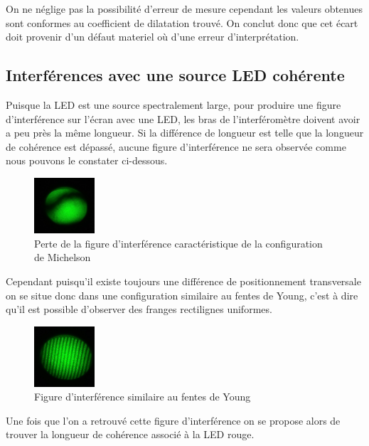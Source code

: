 \documentclass[11pt, openright]{book}
\begin{document}
					On ne néglige pas la possibilité d'erreur de mesure cependant les valeurs obtenues sont conformes au coefficient de dilatation trouvé. On conclut donc que cet écart doit provenir d'un défaut materiel où d'une erreur d'interprétation.

				\subsection{Interférences avec une source LED cohérente}

					Puisque la LED est une source spectralement large, pour produire une figure d'interférence sur l'écran avec une LED, les bras de l'interféromètre doivent avoir a peu près la même longueur. Si la différence de longueur est telle que la longueur de cohérence est dépassé, aucune figure d'interférence ne sera observée comme nous pouvons le constater ci-dessous.

					\begin{figure}[ht!]
						\centering
						\includegraphics[width=0.2\textwidth]{./object/g5.jpg}
						\caption{Perte de la figure d'interférence caractéristique de la configuration de Michelson}
					\end{figure}

					Cependant puisqu'il existe toujours une différence de positionnement transversale on se situe donc dans une configuration similaire au fentes de Young, c'est à dire qu'il est possible d'observer des franges rectilignes uniformes. 

					\begin{figure}[ht!]
						\centering
						\includegraphics[width=0.2\textwidth]{./object/g6.jpg}
						\caption{Figure d'interférence similaire au fentes de Young}
					\end{figure}

					Une fois que l'on a retrouvé cette figure d'interférence on se propose alors de trouver la longueur de cohérence associé à la LED rouge.
\end{document}
